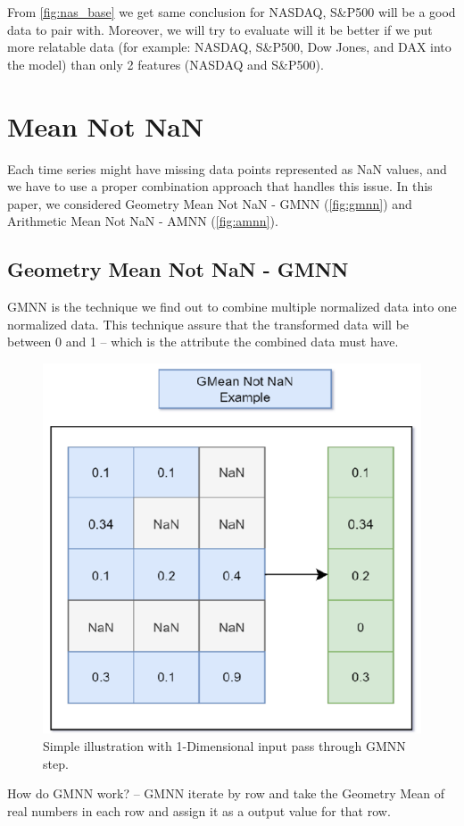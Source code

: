 From \autoref{fig:nas_base} we get same conclusion for NASDAQ, S\&P500 will be a good data to pair with. Moreover, we will try to evaluate will it be better if we put more relatable data (for example: NASDAQ, S\&P500, Dow Jones, and DAX into the model) than only 2 features (NASDAQ and S\&P500).

\section{Mean Not NaN}
Each time series might have missing data points represented as NaN values, and we have to use a proper combination approach that handles this issue. In this paper, we considered Geometry Mean Not NaN - GMNN (\autoref{fig:gmnn}) and Arithmetic Mean Not NaN - AMNN (\autoref{fig:amnn}).

\subsection{Geometry Mean Not NaN - GMNN}
GMNN is the technique we find out to combine multiple normalized data into one
normalized data. This technique assure that the transformed data will be between
0 and 1 – which is the attribute the combined data must have.

\begin{figure}[H]
	\centering
	\includegraphics[width=0.7\linewidth]{images/gmnn.eps}
	\caption{Simple illustration with 1-Dimensional input pass through GMNN step.}
	\label{fig:gmnn}
\end{figure}

How do GMNN work? – GMNN iterate by row and take the Geometry Mean of real numbers
in each row and assign it as a output value for that row.

